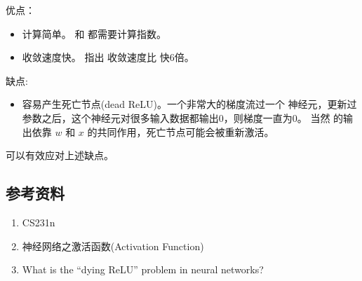 \documentclass[letterpaper,10pt,english]{sphinxmanual}
\let\sphinxpxdimen\pdfpxdimen\else\newdimen\sphinxpxdimen
\begin{document}
优点：
\begin{itemize}
\item {} 
计算简单。  和  都需要计算指数。

\item {} 
收敛速度快。  指出  收敛速度比  快6倍。
\begin{quote}

\noindent{\hspace*{\fill}\sphinxincludegraphics[width=500\sphinxpxdimen]{{02_alexplot}.jpeg}\hspace*{\fill}}
\end{quote}

\end{itemize}

缺点:
\begin{itemize}
\item {} 
容易产生死亡节点(dead ReLU)。一个非常大的梯度流过一个  神经元，更新过参数之后，这个神经元对很多输入数据都输出0，则梯度一直为0。
当然  的输出依靠 \(w\) 和 \(x\) 的共同作用，死亡节点可能会被重新激活。

\end{itemize}

 可以有效应对上述缺点。


\subsection{参考资料}
\label{\detokenize{deepLearning/02_activationFunction:id1}}\begin{enumerate}
\item {} 
CS231n

\end{enumerate}
\begin{quote}

\end{quote}
\begin{enumerate}
\setcounter{enumi}{1}
\item {} 
神经网络之激活函数(Activation Function)

\end{enumerate}
\begin{quote}

\end{quote}
\begin{enumerate}
\setcounter{enumi}{2}
\item {} 
What is the “dying ReLU” problem in neural networks?

\end{enumerate}
\begin{quote}

\end{quote}
\end{document}
